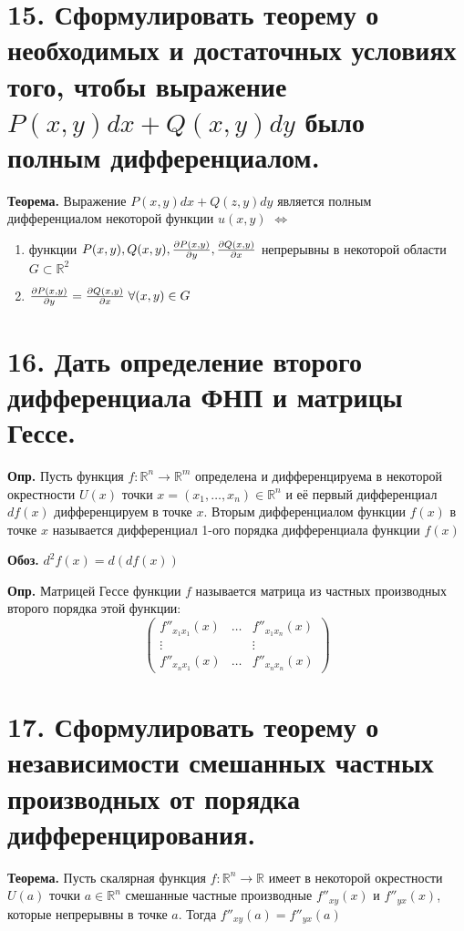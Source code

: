 \documentclass[11pt]{article}
\begin{document}
\section*{15. Сформулировать теорему о необходимых и достаточных условиях того, чтобы выражение $P(x, y) dx + Q(x, y) dy$ было полным дифференциалом.}
\par\textbf{Теорема.} Выражение $P(x, y)dx + Q(z, y)dy$ является полным дифференциалом некоторой функции $u(x, y)$ $\iff$
\begin{enumerate}
\item функции $P(x, y), Q(x, y), \large\frac{\partial P(x, y)}{\partial y}, \frac{\partial Q(x, y)}{\partial x}$ непрерывны в некоторой области $G \subset \mathbb{R}^{2}$
\item $\large\frac{\partial P(x, y)}{\partial y} = \frac{\partial Q(x, y)}{\partial x} \; \forall (x, y) \in G$ 
\end{enumerate}
\section*{16. Дать определение второго дифференциала ФНП и матрицы Гессе.}
\par\textbf{Опр.} Пусть функция $f: \mathbb{R}^{n} \to \mathbb{R}^{m}$ определена и дифференцируема в некоторой окрестности $U(x)$ точки $x = (x_{1}, \dots, x_{n}) \in \mathbb{R}^{n}$ и её первый дифференциал $df(x)$ дифференцируем в точке $x$. Вторым дифференциалом функции $f(x)$ в точке $x$ называется дифференциал 1-ого порядка дифференциала функции $f(x)$
\par\textbf{Обоз.} $d^2f(x) = d(df(x))$
\par\textbf{Опр.} Матрицей Гессе функции $f$ называется матрица из частных производных второго порядка этой функции:
$$\left(\begin{matrix}
f''_{x_{1}x_{1}}(x) & \dots & f''_{x_{1}x_{n}}(x) \\
\vdots & & \vdots \\
f''_{x_{n}x_{1}}(x) & \dots & f''_{x_{n}x_{n}}(x)
\end{matrix}\right)$$
\section*{17. Сформулировать теорему о независимости смешанных частных производных от порядка дифференцирования.}
\par\textbf{Теорема.} Пусть скалярная функция $f: \mathbb{R}^{n} \to \mathbb{R}$ имеет в некоторой окрестности $U(a)$ точки $a \in \mathbb{R}^{n}$ смешанные частные производные $f''_{xy}(x)$ и $f''_{yx}(x)$, которые непрерывны в точке $a$. Тогда $f''_{xy}(a) = f''_{yx}(a)$
\end{document}
